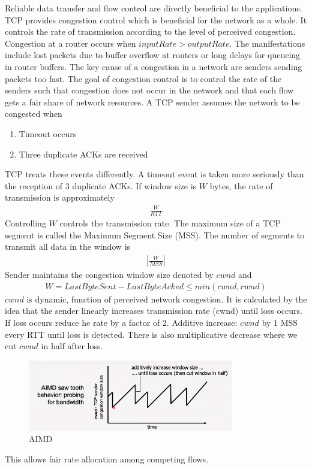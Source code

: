 \documentclass[a4paper]{article}
\theoremstyle{plain}
\theoremstyle{definition}
\newtheorem{defn}{Definition}[section]
\theoremstyle{remark}
\begin{document}
\begin{tcolorbox}[colback=black!3!white,colframe=black!60!white,title=\begin{defn}Congestion Control \label{Congestion Control}\end{defn}]
Reliable data transfer and flow control are directly beneficial to the applications. TCP provides congestion control which is beneficial for the network as a whole. It controls the rate of transmission according to the level of perceived congestion. \\
Congestion at a router occurs when $inputRate > outputRate$. The manifestations include lost packets due to buffer overflow at routers or long delays for queueing in router buffers. The key cause of a congestion in a network are senders sending packets too fast. The goal of congestion control is to control the rate of the senders such that congestion does not occur in the network and that each flow gets a fair share of network resources. A TCP sender assumes the network to be congested when
\begin{enumerate}
	\item Timeout occurs
	\item Three duplicate ACKs are received
\end{enumerate}
TCP treats these events differently. A timeout event is taken more seriously than the reception of $3$ duplicate ACKs. If window size is $W$ bytes, the rate of transmission is approximately
\begin{align*}
	\frac{W}{RTT}
\end{align*}
Controlling $W$ controls the transmission rate. The maximum size of a TCP segment is called the Maximum Segment Size (MSS). The number of segments to transmit all data in the window is
\begin{align*}
	 \left|\frac{W}{MSS}\right|
\end{align*}
Sender maintains the congestion window size denoted by $cwnd$ and 
\begin{align*}
	W = LastByteSent - LastByteAcked \le min\left( cwnd,rwnd \right) 
\end{align*}
$cwnd$ is dynamic, function of perceived network congestion. It is calculated by the idea that the sender linearly increases transmission rate (cwnd) until loss occurs. If loss occurs  reduce he rate by a factor of $2$. Additive increase: $cwnd$ by $1 $ MSS every RTT until loss is detected. There is also multiplicative decrease where we cut $cwnd$ in half after loss. 
\begin{figure}[H]
	\centering
	\includegraphics[width=0.8\textwidth]{sixtyfive.png}
	\caption{AIMD}
	\label{fig:sixtyfive-png}
\end{figure}	
This allows fair rate allocation among competing flows.
\end{tcolorbox}
\end{document}

